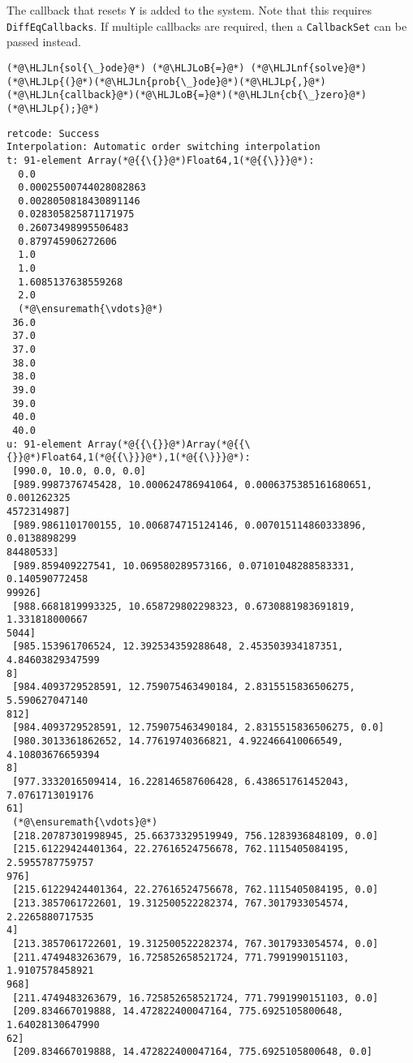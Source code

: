 \documentclass[12pt,a4paper]{article}
\newcommand{\HLJLn}[1]{#1}
\newcommand{\HLJLnf}[1]{\textcolor[RGB]{66,102,213}{#1}}
\newcommand{\HLJLoB}[1]{\textcolor[RGB]{102,102,102}{\textbf{#1}}}
\newcommand{\HLJLp}[1]{#1}
\begin{document}
The callback that resets \texttt{Y} is added to the system. Note that this requires \texttt{DiffEqCallbacks}. If multiple callbacks are required, then a \texttt{CallbackSet} can be passed instead.


\begin{lstlisting}
(*@\HLJLn{sol{\_}ode}@*) (*@\HLJLoB{=}@*) (*@\HLJLnf{solve}@*)(*@\HLJLp{(}@*)(*@\HLJLn{prob{\_}ode}@*)(*@\HLJLp{,}@*)(*@\HLJLn{callback}@*)(*@\HLJLoB{=}@*)(*@\HLJLn{cb{\_}zero}@*)(*@\HLJLp{);}@*)
\end{lstlisting}

\begin{lstlisting}
retcode: Success
Interpolation: Automatic order switching interpolation
t: 91-element Array(*@{{\{}}@*)Float64,1(*@{{\}}}@*):
  0.0
  0.00025500744028082863
  0.0028050818430891146
  0.028305825871171975
  0.26073498995506483
  0.879745906272606
  1.0
  1.0
  1.6085137638559268
  2.0
  (*@\ensuremath{\vdots}@*)
 36.0
 37.0
 37.0
 38.0
 38.0
 39.0
 39.0
 40.0
 40.0
u: 91-element Array(*@{{\{}}@*)Array(*@{{\{}}@*)Float64,1(*@{{\}}}@*),1(*@{{\}}}@*):
 [990.0, 10.0, 0.0, 0.0]
 [989.9987376745428, 10.000624786941064, 0.0006375385161680651, 0.001262325
4572314987]
 [989.9861101700155, 10.006874715124146, 0.007015114860333896, 0.0138898299
84480533]
 [989.859409227541, 10.069580289573166, 0.07101048288583331, 0.140590772458
99926]
 [988.6681819993325, 10.658729802298323, 0.6730881983691819, 1.331818000667
5044]
 [985.153961706524, 12.392534359288648, 2.453503934187351, 4.84603829347599
8]
 [984.4093729528591, 12.759075463490184, 2.8315515836506275, 5.590627047140
812]
 [984.4093729528591, 12.759075463490184, 2.8315515836506275, 0.0]
 [980.3013361862652, 14.77619740366821, 4.922466410066549, 4.10803676659394
8]
 [977.3332016509414, 16.228146587606428, 6.438651761452043, 7.0761713019176
61]
 (*@\ensuremath{\vdots}@*)
 [218.20787301998945, 25.66373329519949, 756.1283936848109, 0.0]
 [215.61229424401364, 22.27616524756678, 762.1115405084195, 2.5955787759757
976]
 [215.61229424401364, 22.27616524756678, 762.1115405084195, 0.0]
 [213.3857061722601, 19.312500522282374, 767.3017933054574, 2.2265880717535
4]
 [213.3857061722601, 19.312500522282374, 767.3017933054574, 0.0]
 [211.4749483263679, 16.725852658521724, 771.7991990151103, 1.9107578458921
968]
 [211.4749483263679, 16.725852658521724, 771.7991990151103, 0.0]
 [209.834667019888, 14.472822400047164, 775.6925105800648, 1.64028130647990
62]
 [209.834667019888, 14.472822400047164, 775.6925105800648, 0.0]
\end{lstlisting}
\end{document}
